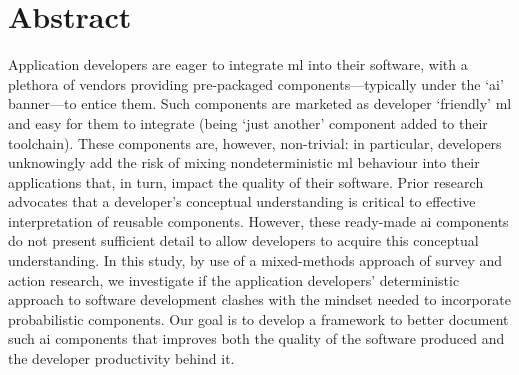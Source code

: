 \chapter*{Abstract}


Application developers are eager to integrate \gls{ml} into their software, with a plethora of vendors providing pre-packaged components---typically under the `\gls{ai}' banner---to entice them.
Such components are marketed as developer `friendly' \gls{ml} and easy for them to integrate (being `just another' component added to their toolchain). These components are, however, non-trivial: in particular, developers unknowingly add the risk of mixing nondeterministic \gls{ml} behaviour into their applications that, in turn, impact the quality of their software.
Prior research advocates that a developer's conceptual understanding is critical to effective interpretation of reusable components. However, these ready-made \gls{ai} components do not present sufficient detail to allow developers to acquire this conceptual understanding.
In this study, by use of a mixed-methods approach of survey and action research, we investigate if the application developers' deterministic approach to software development clashes with the mindset needed to incorporate probabilistic components. Our goal is to develop a framework to better document such \gls{ai} components that improves both the quality of the software produced and the developer productivity behind it.

